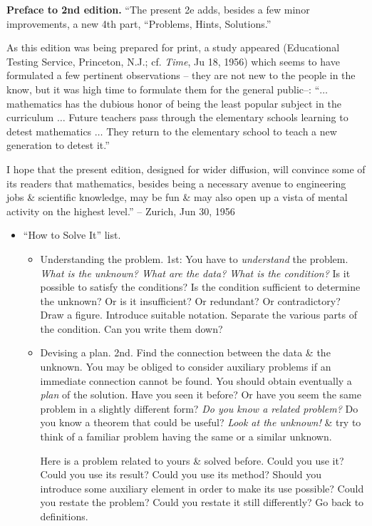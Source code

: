 \documentclass{article}
\begin{document}
\begin{enumerate}
	{\bf Preface to 2nd edition.} ``The present 2e adds, besides a few minor improvements, a new 4th part, ``Problems, Hints, Solutions.''
	
	As this edition was being prepared for print, a study appeared (Educational Testing Service, Princeton, N.J.; cf. {\it Time}, Ju 18, 1956) which seems to have formulated a few pertinent observations -- they are not new to the people in the know, but it was high time to formulate them for the general public--: ``$\ldots$ mathematics has the dubious honor of being the least popular subject in the curriculum $\ldots$ Future teachers pass through the elementary schools learning to detest mathematics $\ldots$ They return to the elementary school to teach a new generation to detest it.''
	
	I hope that the present edition, designed for wider diffusion, will convince some of its readers that mathematics, besides being a necessary avenue to engineering jobs \& scientific knowledge, may be fun \& may also open up a vista of mental activity on the highest level.'' -- Zurich, Jun 30, 1956
	\begin{itemize}
		\item {\sf ``How to Solve It'' list.}
		\begin{itemize}
			\item {\sc Understanding the problem.} 1st: You have to {\it understand} the problem. {\it What is the unknown? What are the data? What is the condition?} Is it possible to satisfy the conditions? Is the condition sufficient to determine the unknown? Or is it insufficient? Or redundant? Or contradictory? Draw a figure. Introduce suitable notation. Separate the various parts of the condition. Can you write them down?
			\item {\sc Devising a plan.} 2nd. Find the connection between the data \& the unknown. You may be obliged to consider auxiliary problems if an immediate connection cannot be found. You should obtain eventually a {\it plan} of the solution. Have you seen it before? Or have you seem the same problem in a slightly different form? {\it Do you know a related problem?} Do you know a theorem that could be useful? {\it Look at the unknown!} \& try to think of a familiar problem having the same or a similar unknown.
			
			{\sf Here is a problem related to yours \& solved before. Could you use it?} Could you use its result? Could you use its method? Should you introduce some auxiliary element in order to make its use possible? Could you restate the problem? Could you restate it still differently? Go back to definitions.
			

\end{itemize}
\end{itemize}
\end{enumerate}
\end{document}
